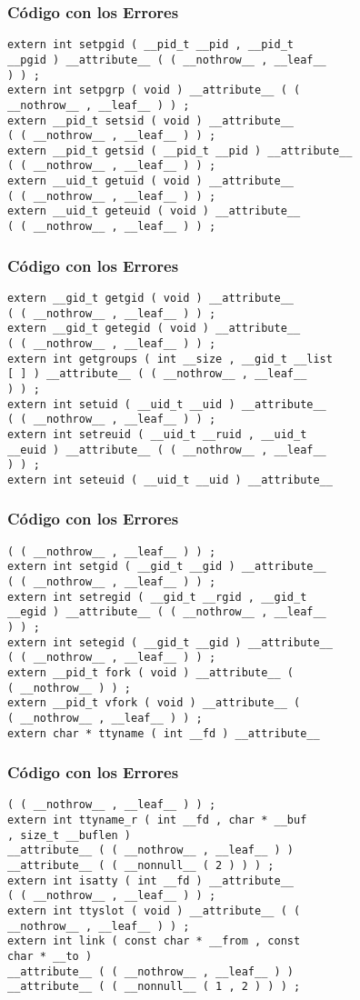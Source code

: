 \documentclass{beamer}
\begin{document}
\begin{frame}[fragile]
\frametitle{C\'odigo con los Errores}
\begin{verbatim}
extern int setpgid ( __pid_t __pid , __pid_t 
__pgid ) __attribute__ ( ( __nothrow__ , __leaf__ 
) ) ; 
extern int setpgrp ( void ) __attribute__ ( ( 
__nothrow__ , __leaf__ ) ) ; 
extern __pid_t setsid ( void ) __attribute__ 
( ( __nothrow__ , __leaf__ ) ) ; 
extern __pid_t getsid ( __pid_t __pid ) __attribute__ 
( ( __nothrow__ , __leaf__ ) ) ; 
extern __uid_t getuid ( void ) __attribute__ 
( ( __nothrow__ , __leaf__ ) ) ; 
extern __uid_t geteuid ( void ) __attribute__ 
( ( __nothrow__ , __leaf__ ) ) ; 
\end{verbatim}
\end{frame}
\begin{frame}[fragile]
\frametitle{C\'odigo con los Errores}
\begin{verbatim}
extern __gid_t getgid ( void ) __attribute__ 
( ( __nothrow__ , __leaf__ ) ) ; 
extern __gid_t getegid ( void ) __attribute__ 
( ( __nothrow__ , __leaf__ ) ) ; 
extern int getgroups ( int __size , __gid_t __list 
[ ] ) __attribute__ ( ( __nothrow__ , __leaf__ 
) ) ; 
extern int setuid ( __uid_t __uid ) __attribute__ 
( ( __nothrow__ , __leaf__ ) ) ; 
extern int setreuid ( __uid_t __ruid , __uid_t 
__euid ) __attribute__ ( ( __nothrow__ , __leaf__ 
) ) ; 
extern int seteuid ( __uid_t __uid ) __attribute__ 
\end{verbatim}
\end{frame}
\begin{frame}[fragile]
\frametitle{C\'odigo con los Errores}
\begin{verbatim}
( ( __nothrow__ , __leaf__ ) ) ; 
extern int setgid ( __gid_t __gid ) __attribute__ 
( ( __nothrow__ , __leaf__ ) ) ; 
extern int setregid ( __gid_t __rgid , __gid_t 
__egid ) __attribute__ ( ( __nothrow__ , __leaf__ 
) ) ; 
extern int setegid ( __gid_t __gid ) __attribute__ 
( ( __nothrow__ , __leaf__ ) ) ; 
extern __pid_t fork ( void ) __attribute__ ( 
( __nothrow__ ) ) ; 
extern __pid_t vfork ( void ) __attribute__ ( 
( __nothrow__ , __leaf__ ) ) ; 
extern char * ttyname ( int __fd ) __attribute__ 
\end{verbatim}
\end{frame}
\begin{frame}[fragile]
\frametitle{C\'odigo con los Errores}
\begin{verbatim}
( ( __nothrow__ , __leaf__ ) ) ; 
extern int ttyname_r ( int __fd , char * __buf 
, size_t __buflen ) 
__attribute__ ( ( __nothrow__ , __leaf__ ) ) 
__attribute__ ( ( __nonnull__ ( 2 ) ) ) ; 
extern int isatty ( int __fd ) __attribute__ 
( ( __nothrow__ , __leaf__ ) ) ; 
extern int ttyslot ( void ) __attribute__ ( ( 
__nothrow__ , __leaf__ ) ) ; 
extern int link ( const char * __from , const 
char * __to ) 
__attribute__ ( ( __nothrow__ , __leaf__ ) ) 
__attribute__ ( ( __nonnull__ ( 1 , 2 ) ) ) ; 
\end{verbatim}
\end{frame}
\end{document}
